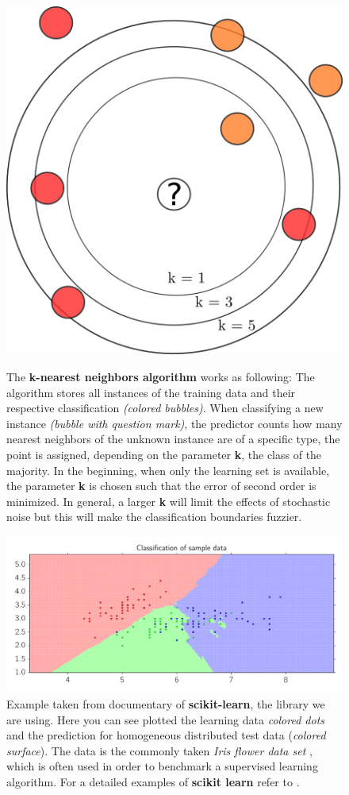 \begin{figure}
    \centering
    \caption{The \textbf{k-nearest neighbors algorithm} works as following: 
        The algorithm stores all instances of the training data and their respective
    classification \textit{(colored bubbles)}. When classifying a new instance \textit{(bubble with question mark)}, the 
    predictor counts how many nearest neighbors of the unknown instance are of a specific type, the point is assigned, 
    depending on the parameter \textbf{k}, the class of the majority. In the beginning, when only the learning set is available,
    the parameter \textbf{k} is chosen such that the error of second order is minimized. In general, a larger \textbf{k} will
    limit the effects of stochastic noise but this will make the classification boundaries fuzzier.}
    \includegraphics[width=0.5\linewidth]{figures/knn_schema}
\label{fig:knn_schema}
\end{figure}

\begin{figure}[htpb]
    \centering
    \includegraphics[width=1\linewidth]{figures/kneigbors}
    \caption{Example taken from documentary of \textbf{scikit-learn}\cite{scikit-learn}, the library we are using. Here you can
    see plotted the learning data \textit{colored dots} and the prediction for homogeneous distributed test data
(\textit{colored surface}). The data is the commonly taken \textit{Iris flower data set} \cite{frank1968numerical}, which
    is often used in order to benchmark a supervised learning algorithm. For a detailed examples of \textbf{scikit learn}
    refer to \cite{masteringscikit}.}
\label{fig:kneigbors}
\end{figure}

